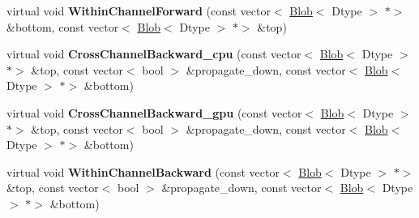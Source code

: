 \begin{DoxyCompactItemize}
virtual void {\bfseries Within\+Channel\+Forward} (const vector$<$ \mbox{\hyperlink{classcaffe_1_1_blob}{Blob}}$<$ Dtype $>$ $\ast$$>$ \&bottom, const vector$<$ \mbox{\hyperlink{classcaffe_1_1_blob}{Blob}}$<$ Dtype $>$ $\ast$$>$ \&top)
\item 
\mbox{\label{classcaffe_1_1_l_r_n_layer_a7bd3b117bdffa1d0c275a8ae364a1479}} 
virtual void {\bfseries Cross\+Channel\+Backward\+\_\+cpu} (const vector$<$ \mbox{\hyperlink{classcaffe_1_1_blob}{Blob}}$<$ Dtype $>$ $\ast$$>$ \&top, const vector$<$ bool $>$ \&propagate\+\_\+down, const vector$<$ \mbox{\hyperlink{classcaffe_1_1_blob}{Blob}}$<$ Dtype $>$ $\ast$$>$ \&bottom)
\item 
\mbox{\label{classcaffe_1_1_l_r_n_layer_a9440436b087c68fa9a57184db675568c}} 
virtual void {\bfseries Cross\+Channel\+Backward\+\_\+gpu} (const vector$<$ \mbox{\hyperlink{classcaffe_1_1_blob}{Blob}}$<$ Dtype $>$ $\ast$$>$ \&top, const vector$<$ bool $>$ \&propagate\+\_\+down, const vector$<$ \mbox{\hyperlink{classcaffe_1_1_blob}{Blob}}$<$ Dtype $>$ $\ast$$>$ \&bottom)
\item 
\mbox{\label{classcaffe_1_1_l_r_n_layer_ab33b51cf1a906fc8379389ceb1efd0a8}} 
virtual void {\bfseries Within\+Channel\+Backward} (const vector$<$ \mbox{\hyperlink{classcaffe_1_1_blob}{Blob}}$<$ Dtype $>$ $\ast$$>$ \&top, const vector$<$ bool $>$ \&propagate\+\_\+down, const vector$<$ \mbox{\hyperlink{classcaffe_1_1_blob}{Blob}}$<$ Dtype $>$ $\ast$$>$ \&bottom)
\end{DoxyCompactItemize}
